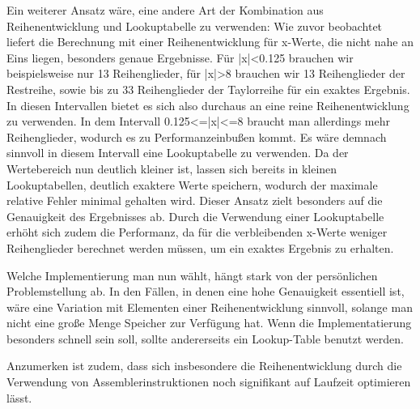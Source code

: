 \documentclass[course=erap] {aspdoc}
\begin{document}
     Ein weiterer Ansatz wäre, eine andere Art der Kombination aus Reihenentwicklung und Lookuptabelle zu verwenden: 
     Wie zuvor beobachtet liefert die Berechnung mit einer Reihenentwicklung für x-Werte, die nicht nahe an Eins liegen, besonders genaue Ergebnisse. Für |x|<0.125 brauchen wir beispielsweise nur 13 Reihenglieder, für |x|>8 brauchen wir 13 Reihenglieder der Restreihe, sowie bis zu 33 Reihenglieder der Taylorreihe für ein exaktes Ergebnis. In diesen Intervallen bietet es sich also durchaus an eine reine Reihenentwicklung zu verwenden. In dem Intervall 0.125<=|x|<=8 braucht man allerdings mehr Reihenglieder, wodurch es zu Performanzeinbußen kommt. Es wäre demnach sinnvoll in diesem Intervall eine Lookuptabelle zu verwenden. Da der Wertebereich nun deutlich kleiner ist, lassen sich bereits in kleinen Lookuptabellen, deutlich exaktere Werte speichern, wodurch der maximale relative Fehler minimal gehalten wird. Dieser Ansatz zielt besonders auf die Genauigkeit des Ergebnisses ab. Durch die Verwendung einer Lookuptabelle erhöht sich zudem die Performanz, da für die verbleibenden x-Werte weniger Reihenglieder berechnet werden müssen, um ein exaktes Ergebnis zu erhalten. 
     
     Welche Implementierung man nun wählt, hängt stark von der persönlichen Problemstellung ab. In den Fällen, in denen eine hohe Genauigkeit essentiell ist, wäre eine Variation mit Elementen einer Reihenentwicklung sinnvoll, solange man nicht eine große Menge Speicher zur Verfügung hat.
     Wenn die Implementatierung besonders schnell sein soll, sollte andererseits ein Lookup-Table benutzt werden.

     Anzumerken ist zudem, dass sich insbesondere die Reihenentwicklung durch die Verwendung von Assemblerinstruktionen noch signifikant auf Laufzeit optimieren lässt. 
 
     
     
 
 
\end{document}
